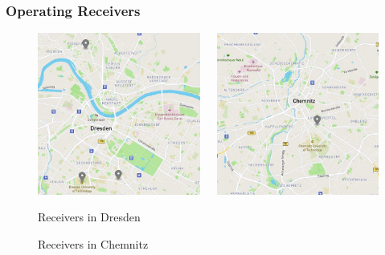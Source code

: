 
\begin{frame}
  \frametitle{Operating Receivers}


\begin{figure}
\begin{columns}
\begin{center}
  \includegraphics[height=0.65\textheight]{figs/map_dresden.jpg}
  \caption{Receivers in Dresden}
\end{center}
\begin{center}
  \includegraphics[height=0.65\textheight]{figs/map_chemnitz.jpg}
  \caption{Receivers in Chemnitz}
\end{center}
\end{columns}
\end{figure}


\end{frame}
